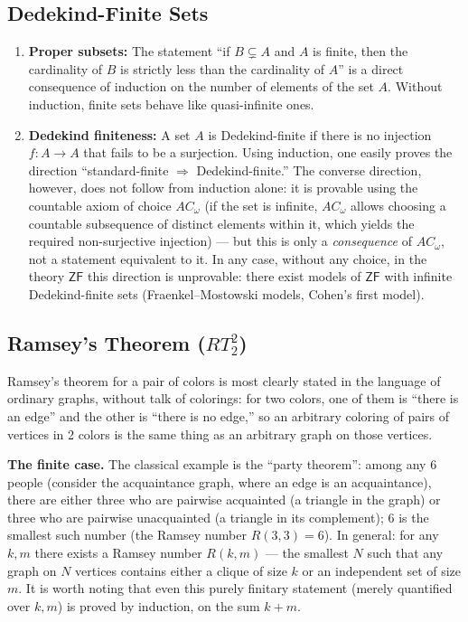 \documentclass[12pt,a4paper]{article}
\theoremstyle{plain}
\theoremstyle{definition}
\newcommand{\toinf}{\rightarrow}
\begin{document}
\subsection{Dedekind-Finite Sets}
\begin{enumerate}[label=\arabic*.]
    \item \textbf{Proper subsets:} The statement ``if $B \subsetneq A$ and $A$ is finite, then the cardinality of $B$ is strictly less than the cardinality of $A$'' is a direct consequence of induction on the number of elements of the set $A$. Without induction, finite sets behave like quasi-infinite ones.
    \item \textbf{Dedekind finiteness:} A set $A$ is Dedekind-finite if there is no injection $f: A \toinf A$ that fails to be a surjection. Using induction, one easily proves the direction ``standard-finite $\Rightarrow$ Dedekind-finite.'' The converse direction, however, does not follow from induction alone: it is provable using the countable axiom of choice $AC_\omega$ (if the set is infinite, $AC_\omega$ allows choosing a countable subsequence of distinct elements within it, which yields the required non-surjective injection) --- but this is only a \emph{consequence} of $AC_\omega$, not a statement equivalent to it. In any case, without any choice, in the theory $\textsf{ZF}$ this direction is unprovable: there exist models of $\textsf{ZF}$ with infinite Dedekind-finite sets (Fraenkel--Mostowski models, Cohen's first model).
\end{enumerate}

\subsection{Ramsey's Theorem ($RT^2_2$)}
Ramsey's theorem for a pair of colors is most clearly stated in the language of ordinary graphs, without talk of colorings: for two colors, one of them is ``there is an edge'' and the other is ``there is no edge,'' so an arbitrary coloring of pairs of vertices in 2 colors is the same thing as an arbitrary graph on those vertices.

\textbf{The finite case.} The classical example is the ``party theorem'': among any 6 people (consider the acquaintance graph, where an edge is an acquaintance), there are either three who are pairwise acquainted (a triangle in the graph) or three who are pairwise unacquainted (a triangle in its complement); 6 is the smallest such number (the Ramsey number $R(3,3)=6$). In general: for any $k,m$ there exists a Ramsey number $R(k,m)$ --- the smallest $N$ such that any graph on $N$ vertices contains either a clique of size $k$ or an independent set of size $m$. It is worth noting that even this purely finitary statement (merely quantified over $k,m$) is proved by induction, on the sum $k+m$.
\end{document}
